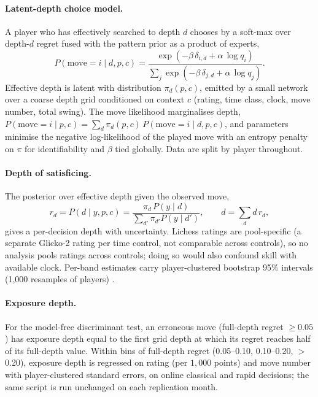 \paragraph{Latent-depth choice model.}
A player who has effectively searched to depth $d$ chooses by a soft-max over depth-$d$
regret fused with the pattern prior as a product of experts,
\begin{equation}
P(\text{move}{=}i \mid d,p,c)=
\frac{\exp(-\beta\,\delta_{i,d}+\alpha\,\log q_i)}
     {\sum_j \exp(-\beta\,\delta_{j,d}+\alpha\,\log q_j)} .
\end{equation}
Effective depth is latent with distribution $\pi_d(p,c)$, emitted by a small network over a
coarse depth grid conditioned on context $c$ (rating, time class, clock, move number, total
swing). The move likelihood marginalises depth,
$P(\text{move}{=}i\mid p,c)=\sum_d \pi_d(p,c)\,P(\text{move}{=}i\mid d,p,c)$, and parameters
minimise the negative log-likelihood of the played move with an entropy penalty on $\pi$ for
identifiability and $\beta$ tied globally. Data are split by player throughout.

\paragraph{Depth of satisficing.}
The posterior over effective depth given the observed move,
\begin{equation}
r_d=P(d\mid y,p,c)=\frac{\pi_d\,P(y\mid d)}{\sum_{d'}\pi_{d'}P(y\mid d')},
\qquad \hat d=\sum_d d\,r_d ,
\end{equation}
gives a per-decision depth with uncertainty. Lichess ratings are pool-specific (a separate
Glicko-2 rating per time control, not comparable across controls), so no analysis pools
ratings across controls; doing so would also confound skill with available clock. Per-band
estimates carry player-clustered bootstrap 95\% intervals (1{,}000 resamples of players)
\citep{efron1979}.

\paragraph{Exposure depth.}
For the model-free discriminant test, an erroneous move (full-depth regret $\ge0.05$) has
exposure depth equal to the first grid depth at which its regret reaches half of its
full-depth value. Within bins of full-depth regret (0.05--0.10, 0.10--0.20, $>$0.20), exposure
depth is regressed on rating (per $1{,}000$ points) and move number with player-clustered
standard errors, on online classical and rapid decisions; the same script is run unchanged on
each replication month.

